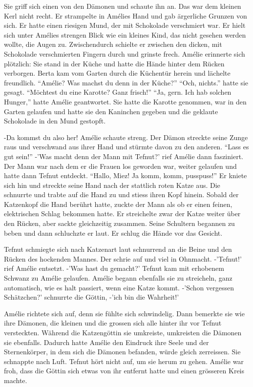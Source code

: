 \documentclass[11pt,titlepage,a5paper]{book}
\begin{document}
 Sie griff sich einen von den Dämonen und schaute ihn an. Das war dem kleinen Kerl nicht recht. Er strampelte in Amélies Hand und gab ärgerliche Grunzen von sich. Er hatte einen riesigen Mund, der mit Schokolade verschmiert war. Er hielt sich unter Amélies strengen Blick wie ein kleines Kind, das nicht gesehen werden wollte, die Augen zu. Zwischendurch schielte er zwischen den dicken, mit Schokolade verschmierten Fingern durch und grinste frech. Amélie erinnerte sich plötzlich: Sie stand in der Küche und hatte die Hände hinter dem Rücken verborgen. Berta kam vom Garten durch die Küchentür herein und lächelte freundlich. "`Amélie? Was machst du denn in der Küche?"' "`Och, nichts."' hatte sie gesagt. "`Möchtest du eine Karotte? Ganz frisch!"' "`Ja, gern. Ich hab solchen Hunger,"' hatte Amélie geantwortet. Sie hatte die Karotte genommen, war in den Garten gelaufen und hatte sie den Kaninchen gegeben und die geklaute Schokolade in den Mund gestopft.

-Da kommst du also her! Amélie schaute streng. Der Dämon streckte seine Zunge raus und verschwand aus ihrer Hand und stürmte davon zu den anderen. "`Lass es gut sein!"' -'Was macht denn der Mann mit Tefnut?' rief Amélie  dann fasziniert. Der Mann war nach dem er die Frauen los geworden war, weiter gelaufen und hatte dann Tefnut entdeckt. "`Hallo, Miez! Ja komm, komm, pusspuss!"' Er kniete sich hin und streckte seine Hand nach der stattlich roten Katze aus. Die schnurrte und trabte auf die Hand zu und stiess ihren Kopf hinein. Sobald der Katzenkopf die Hand berührt hatte, zuckte der Mann als ob er einen feinen, elektrischen Schlag bekommen hatte. Er streichelte zwar der Katze weiter über den Rücken, aber sackte gleichzeitig zusammen. Seine Schultern begannen zu beben und dann schluchzte er laut. Er schlug die Hände vor das Gesicht.

Tefnut schmiegte sich nach Katzenart laut schnurrend an die Beine und den Rücken des hockenden Mannes. Der schrie auf und viel in Ohnmacht. -'Tefnut!' rief Amélie entsetzt. -'Was hast du gemacht?' Tefnut kam mit erhobenem Schwanz zu Amélie gelaufen. Amélie begann ebenfalls sie zu streicheln, ganz automatisch, wie es halt passiert, wenn eine Katze kommt. -'Schon vergessen Schätzchen?' schnurrte die Göttin, -'ich bin die Wahrheit!'

Amélie richtete sich auf, denn sie fühlte sich schwindelig. Dann bemerkte sie wie ihre Dämonen, die kleinen und die grossen sich alle hinter ihr vor Tefnut versteckten. Während die Katzengöttin sie umkreiste, umkreisten die Dämonen sie ebenfalls. Dadurch hatte Amélie den Eindruck ihre Seele und der Sternenkörper, in dem sich die Dämonen befanden, würde gleich zerreissen. Sie schnappte nach Luft. Tefnut hört nicht auf, um sie herum zu gehen. Amélie war froh, dass die Göttin sich etwas von ihr entfernt hatte und einen grösseren Kreis machte.
\end{document}
